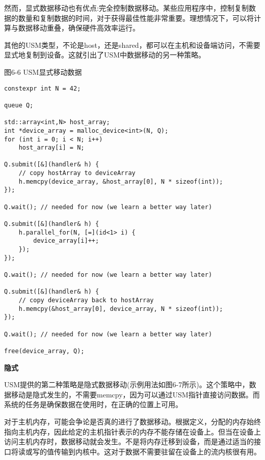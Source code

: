 然而，显式数据移动也有优点:完全控制数据移动。某些应用程序中，控制复制数据的数量和复制数据的时间，对于获得最佳性能非常重要。理想情况下，可以将计算与数据移动重叠，确保硬件高效率运行。\par

其他的USM类型，不论是host，还是shared，都可以在主机和设备端访问，不需要显式地复制到设备。这就引出了USM中数据移动的另一种策略。\par

\hspace*{\fill} \par %
图6-6 USM显式移动数据
\begin{lstlisting}[caption={}]
constexpr int N = 42;

queue Q;

std::array<int,N> host_array;
int *device_array = malloc_device<int>(N, Q);
for (int i = 0; i < N; i++)
	host_array[i] = N;

Q.submit([&](handler& h) {
	// copy hostArray to deviceArray
	h.memcpy(device_array, &host_array[0], N * sizeof(int));
});

Q.wait(); // needed for now (we learn a better way later)

Q.submit([&](handler& h) {
	h.parallel_for(N, [=](id<1> i) {
		device_array[i]++;
	});
});

Q.wait(); // needed for now (we learn a better way later)

Q.submit([&](handler& h) {
	// copy deviceArray back to hostArray
	h.memcpy(&host_array[0], device_array, N * sizeof(int));
});

Q.wait(); // needed for now (we learn a better way later)

free(device_array, Q);
\end{lstlisting}

\hspace*{\fill} \par %
\textbf{隐式}

USM提供的第二种策略是隐式数据移动(示例用法如图6-7所示)。这个策略中，数据移动是隐式发生的，不需要memcpy，因为可以通过USM指针直接访问数据。而系统的任务是确保数据在使用时，在正确的位置上可用。\par

对于主机内存，可能会争论是否真的进行了数据移动。根据定义，分配的内存始终指向主机内存，因此给定的主机指针表示的内存不能存储在设备上。但当在设备上访问主机内存时，数据移动就会发生。不是将内存迁移到设备，而是通过适当的接口将读或写的值传输到内核中。这对于数据不需要驻留在设备上的流内核很有用。\par

